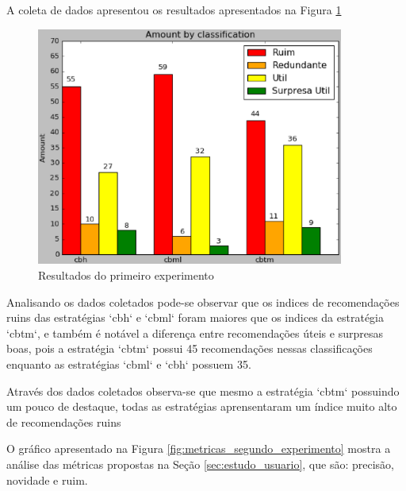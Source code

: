 A coleta de dados apresentou os resultados apresentados na Figura
\ref{fig:primeiro_experimento}

\pagebreak

\begin{figure}[h]
  \centering
  \includegraphics[width=0.9\textwidth]{figuras/primeiro_experimento.eps}
  \caption{Resultados do primeiro experimento}
  \label{fig:primeiro_experimento}
\end{figure}

Analisando os dados coletados pode-se observar que os indices de recomendações
ruins das estratégias `cbh` e `cbml` foram maiores que os indices da estratégia
`cbtm`, e também é notável a diferença entre recomendações úteis e surpresas
boas, pois a estratégia `cbtm` possui 45 recomendações nessas classificações
enquanto as estratégias `cbml` e `cbh` possuem 35.

Através dos dados coletados observa-se que mesmo a estratégia `cbtm` possuindo
um pouco de destaque, todas as estratégias aprensentaram um índice muito alto
de recomendações ruins

O gráfico apresentado na Figura \ref{fig:metricas_segundo_experimento} mostra
a análise das métricas propostas na Seção \ref{sec:estudo_usuario}, que são:
precisão, novidade e ruim.

\pagebreak

